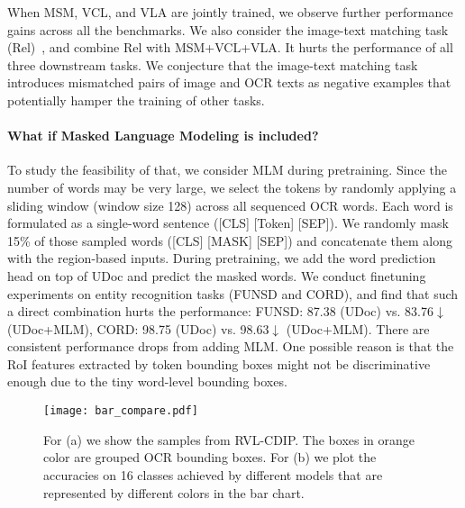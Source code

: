 \documentclass{article}
\begin{document}
When MSM, VCL, and VLA are jointly trained, we observe {further} performance gain{s} across all the benchmarks.
	{We also consider the image-text {matching} task (Rel)~\cite{xu2020layoutlmv2}, and combine Rel with MSM+VCL+VLA}. It hurts the performance of all three downstream tasks.
	{We conjecture that the} image-text matching {task} introduce{s} {mismatched pairs of} image and OCR texts as negative examples {that potentially hamper} the training of other tasks.
	
	\paragraph{What if Masked Language Modeling is included?}
	{To {study the feasibility of that}, we consider MLM during pretraining. Since the number of words may be very {large}, we select the tokens by randomly applying a sliding window (window size 128) across all sequenced OCR words. Each word is formulated as a single-word sentence ([CLS] [Token] [SEP]). We randomly mask 15\% of those sampled words ([CLS] [MASK] [SEP]) and concatenate them along with the region-based inputs. During pretraining, we add the word prediction head on top of UDoc and predict the masked words. We conduct finetuning experiments on entity recognition tasks (FUNSD and CORD), and find that such a direct combination hurts the performance: FUNSD: 87.38 (UDoc) vs. 83.76$\downarrow$ (UDoc+MLM), CORD: 98.75 (UDoc) vs. 98.63$\downarrow$ (UDoc+MLM). There are consistent performance drops from adding MLM. One possible reason is that the RoI features extracted by token bounding boxes might not be discriminative enough due to the tiny word-level bounding boxes}.
	
	\begin{figure*}[t!]
		\begin{center}
			\texttt{[image: bar\_compare.pdf]}
		\end{center}
		\vspace{-3mm}
		\caption{For (a) we show the samples from RVL-CDIP. The boxes in orange color are grouped OCR bounding boxes. For (b) we plot the accuracies on 16 classes achieved by different models that are represented by different colors in the bar chart.}
		\vspace{-6mm}
		\label{fig.doccls_samples}
	\end{figure*}
	
\end{document}
